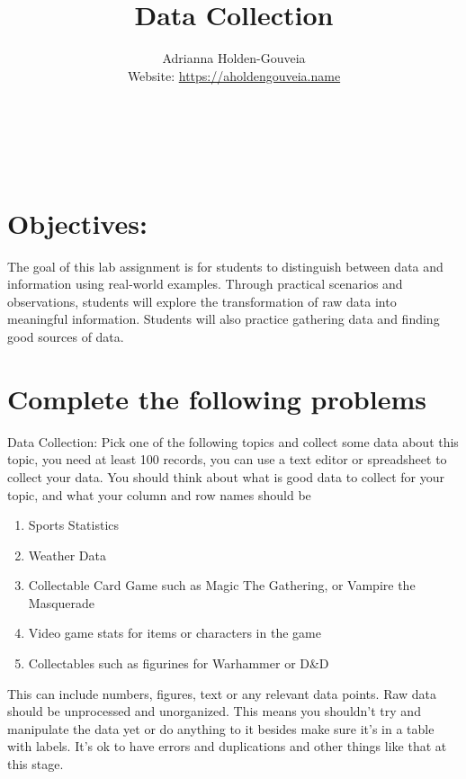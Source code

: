 \documentclass[12pt]{article}
\title{Data Collection}
\author{
        Adrianna Holden-Gouveia \\
        Website: \url{https://aholdengouveia.name}\\ 
        \date{\vspace{-5ex}}
        \faLinkedin{: aholdengouveia} \\
        \faGithub {: aholdengouveia} \\
        \faTwitter {: aholdengouveia} \\
        }
\begin{document}
    

\maketitle


\section*{Objectives:}
    The goal of this lab assignment is for students to distinguish between data and information using real-world examples. Through practical scenarios and observations, students will explore the transformation of raw data into meaningful information.  Students will also practice gathering data and finding good sources of data.
    


\section*{Complete the following problems}
Data Collection:
Pick one of the following topics and collect some data about this topic, you need at least 100 records, you can use a text editor or spreadsheet to collect your data.  You should think about what is good data to collect for your topic, and what your column and row names should be

\begin{enumerate}
    \item Sports Statistics
    \item Weather Data
    \item Collectable Card Game such as Magic The Gathering, or Vampire the Masquerade
    \item Video game stats for items or characters in the game
    \item Collectables such as figurines for Warhammer or D\&D
\end{enumerate}

This can include numbers, figures, text or any relevant data points. Raw data should be unprocessed and unorganized.  This means you shouldn't try and manipulate the data yet or do anything to it besides make sure it's in a table with labels. It's ok to have errors and duplications and other things like that at this stage. 
\end{document}
